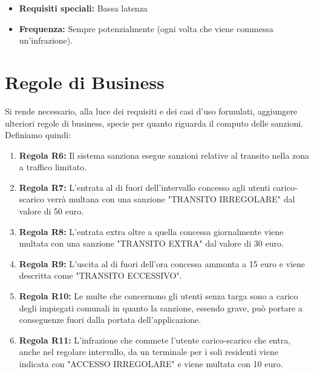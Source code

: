 \documentclass[12pt, letterpaper]{article}
\begin{document}
\begin{itemize}
    \item \textbf{Requisiti speciali:} Bassa latenza
    \item \textbf{Frequenza:} Sempre potenzialmente
    (ogni volta che viene commessa un'infrazione).
\end{itemize}

\section{Regole di Business}
Si rende necessario, alla luce dei requisiti e dei casi 
d'uso formulati, aggiungere ulteriori regole di business,
specie per quanto riguarda il computo delle sanzioni.
Definiamo quindi:
\begin{enumerate}
    \item \textbf{Regola R6:} Il sistema sanziona esegue sanzioni
    relative al transito nella zona a traffico limitato.
    \item \textbf{Regola R7:} L'entrata al di fuori dell'intervallo 
    concesso agli utenti carico-scarico verrà multana con 
    una sanzione "TRANSITO IRREGOLARE" dal valore di 50 euro.
    \item \textbf{Regola R8:} L'entrata extra oltre a quella 
    concessa giornalmente viene multata con una sanzione 
    "TRANSITO EXTRA" dal valore di 30 euro.
    \item \textbf{Regola R9:} L'uscita al di fuori dell'ora 
    concessa ammonta a 15 euro e viene descritta come 
    "TRANSITO ECCESSIVO".
    \item \textbf{Regola R10:} Le multe che concernono gli utenti 
    senza targa sono a carico degli impiegati comunali in quanto 
    la sanzione, essendo grave, può portare a conseguenze fuori 
    dalla portata dell'applicazione.
    \item \textbf{Regola R11:} L'infrazione che commete l'utente 
    carico-scarico che entra, anche nel regolare intervallo,
    da un terminale per i soli residenti viene indicata con 
    "ACCESSO IRREGOLARE" e viene multata con 10 euro.
\end{enumerate}
\end{document}
